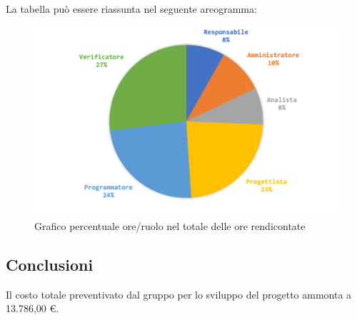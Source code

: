 				La tabella può essere riassunta nel seguente areogramma:
				\begin{figure}[H]
					\centering
					\includegraphics[width=0.8\linewidth]{./images/preventivo/totOreRed2.png}
					\caption{Grafico percentuale ore/ruolo nel totale delle ore rendicontate}
					\label{fig:grafico costi ruolo fase totale ore rendicontate}
				\end{figure}
			
			\subsection{Conclusioni}
				Il costo totale preventivato dal gruppo per lo sviluppo del progetto ammonta a 13.786,00 €.
				
				
		
	
	